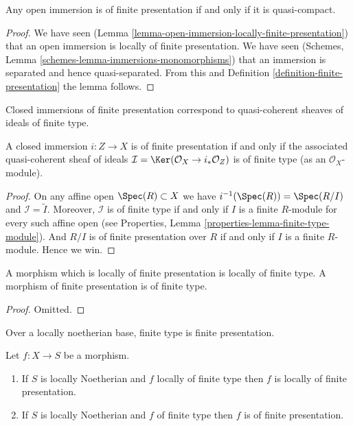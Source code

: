 \begin{lemma}
\label{lemma-quasi-compact-open-immersion-finite-presentation}
Any open immersion is of finite presentation if and only if
it is quasi-compact.
\end{lemma}

\begin{proof}
We have seen (Lemma \ref{lemma-open-immersion-locally-finite-presentation})
that an open immersion is locally of finite presentation.
We have seen (Schemes, Lemma \ref{schemes-lemma-immersions-monomorphisms})
that an immersion is separated and hence quasi-separated. From this
and Definition \ref{definition-finite-presentation} the lemma follows.
\end{proof}

\begin{lemma}
\label{lemma-closed-immersion-finite-presentation}
\begin{slogan}
Closed immersions of finite presentation correspond
to quasi-coherent sheaves of ideals of finite type.
\end{slogan}
A closed immersion $i : Z \to X$ is of finite presentation if and only if
the associated quasi-coherent sheaf of ideals
$\mathcal{I} = \Ker(\mathcal{O}_X \to i_*\mathcal{O}_Z)$
is of finite type (as an $\mathcal{O}_X$-module).
\end{lemma}

\begin{proof}
On any affine open $\Spec(R) \subset X$ we have
$i^{-1}(\Spec(R)) = \Spec(R/I)$ and
$\mathcal{I} = \widetilde{I}$. Moreover, $\mathcal{I}$
is of finite type if and only if $I$ is a finite $R$-module
for every such affine open (see
Properties, Lemma \ref{properties-lemma-finite-type-module}).
And $R/I$ is of finite presentation
over $R$ if and only if $I$ is a finite $R$-module. Hence we win.
\end{proof}

\begin{lemma}
\label{lemma-finite-presentation-finite-type}
A morphism which is locally of finite presentation is locally of finite type.
A morphism of finite presentation is of finite type.
\end{lemma}

\begin{proof}
Omitted.
\end{proof}

\begin{lemma}
\label{lemma-noetherian-finite-type-finite-presentation}
\begin{slogan}
Over a locally noetherian base, finite type is finite presentation.
\end{slogan}
Let $f : X \to S$ be a morphism.
\begin{enumerate}
\item If $S$ is locally Noetherian and $f$ locally of finite type
then $f$ is locally of finite presentation.
\item If $S$ is locally Noetherian and $f$ of finite type
then $f$ is of finite presentation.
\end{enumerate}
\end{lemma}

